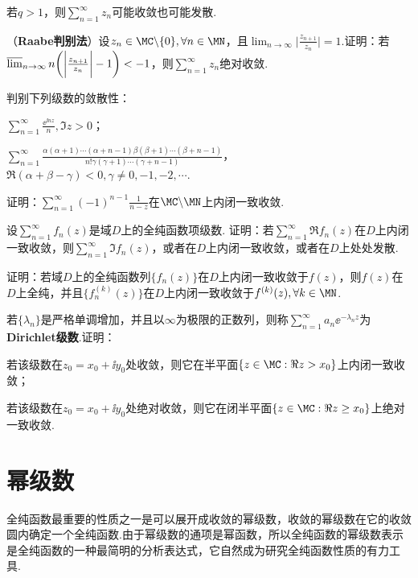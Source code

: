 \begin{xiti}
\begin{enuma}
      \item 若$q>1$，则$\sum_{n=1}^\infty z_n$可能收敛也可能发散.
    \end{enuma}
\item （\textbf{Raabe判别法}）设$z_n\in\MC\backslash\{0\},\forall n\in \MN$，且$\lim_{n\to\infty}\bigg|\frac{z_{n+1}}{z_n}\bigg|=1$.证明：若$\varlimsup_{n\to\infty}n\bigg(\bigg|\frac{z_{n+1}}{z_n}\bigg|-1\bigg)<-1$，则$\sum_{n=1}^\infty z_n$绝对收敛.
\item 判别下列级数的敛散性：
    \begin{enuma}
      \item $\sum_{n=1}^\infty\frac{\ee^{\ii nz}}n,\Im z>0$；
      \item $\sum_{n=1}^\infty\frac{\alpha(\alpha+1)\cdots
          (\alpha+n-1)\beta(\beta+1)\cdots(\beta+n-1)}{n!\gamma(\gamma+1)
          \cdots(\gamma+n-1)}$，$\Re(\alpha+\beta-\gamma)<0,\gamma\ne0,-1,-2,\cdots$.
    \end{enuma}
\item 证明：$\sum_{n=1}^\infty(-1)^{n-1}\frac1{n-z}$在$\MC\backslash\MN$上内闭一致收敛.
\item 设$\sum_{n=1}^\infty f_n(z)$是域$D$上的全纯函数项级数. 证明：若$\sum_{n=1}^\infty\Re f_n(z)$在$D$上内闭一致收敛，则$\sum_{n=1}^\infty \Im f_n(z)$，或者在$D$上内闭一致收敛，或者在$D$上处处发散.
\item 证明：若域$D$上的全纯函数列$\{f_n(z)\}$在$D$上内闭一致收敛于$f(z)$，则$f(z)$在$D$上全纯，并且$\{f_n^{(k)}(z)\}$在$D$上内闭一致收敛于$f^{(k)}(z),\forall k\in\MN$.
\item 若$\{\lambda_n\}$是严格单调增加，并且以$\infty$为极限的正数列，则称$\sum_{n=1}^\infty a_n\ee^{-\lambda_n z}$为\textbf{Dirichlet级数}.证明：
    \begin{enuma}
      \item 若该级数在$z_0=x_0+\ii y_0$处收敛，则它在半平面$\{z\in\MC:\Re z>x_0\}$上内闭一致收敛；
      \item 若该级数在$z_0=x_0+\ii y_0$处绝对收敛，则它在闭半平面$\{z\in\MC:\Re z\ge x_0\}$上绝对一致收敛.
    \end{enuma}
\end{xiti}

\section{幂级数\label{sec4.2}}
全纯函数最重要的性质之一是可以展开成收敛的幂级数，收敛的幂级数在它的收敛圆内确定一个全纯函数.由于幂级数的通项是幂函数，所以全纯函数的幂级数表示是全纯函数的一种最简明的分析表达式，它自然成为研究全纯函数性质的有力工具.

